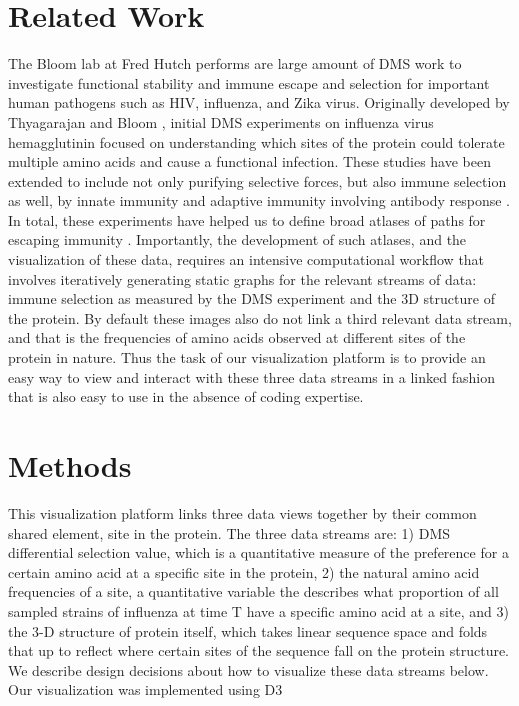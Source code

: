\documentclass[sigchi]{acmart}
\begin{document}
\section{Related Work}

The Bloom lab at Fred Hutch performs are large amount of DMS work to investigate functional stability and immune escape and selection for important human pathogens such as HIV, influenza, and Zika virus. Originally developed by Thyagarajan and Bloom \cite{thyagarajan2014inherent}, initial DMS experiments on influenza virus hemagglutinin focused on understanding which sites of the protein could tolerate multiple amino acids and cause a functional infection. These studies have been extended to include not only purifying selective forces, but also immune selection as well, by innate immunity \cite{ashenberg2017deep} and adaptive immunity involving antibody response \cite{Lee2018}. In total, these experiments have helped us to define broad atlases of paths for escaping immunity \cite{dingens2019antigenic}. Importantly, the development of such atlases, and the visualization of these data, requires an intensive computational workflow that involves iteratively generating static graphs for the relevant streams of data: immune selection as measured by the DMS experiment and the 3D structure of the protein. By default these images also do not link a third relevant data stream, and that is the frequencies of amino acids observed at different sites of the protein in nature. Thus the task of our visualization platform is to provide an easy way to view and interact with these three data streams in a linked fashion that is also easy to use in the absence of coding expertise.

\section{Methods}

This visualization platform links three data views together by their common shared element, site in the protein. The three data streams are: 1) DMS differential selection value, which is a quantitative measure of the preference for a certain amino acid at a specific site in the protein, 2) the natural amino acid frequencies of a site, a quantitative variable the describes what proportion of all sampled strains of influenza at time T have a specific amino acid at a site, and 3) the 3-D structure of protein itself, which takes linear sequence space and folds that up to reflect where certain sites of the sequence fall on the protein structure. We describe design decisions about how to visualize these data streams below. Our visualization was implemented using D3 \cite{bostock2011d3}
\end{document}
